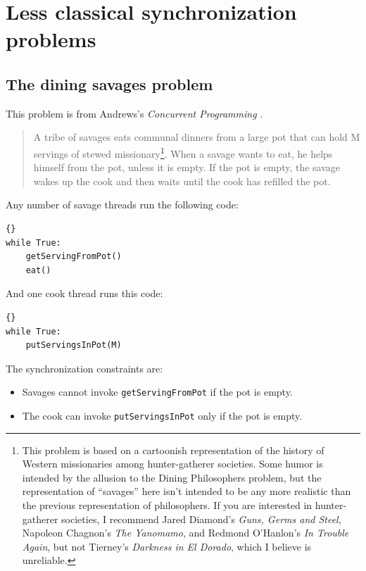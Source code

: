 \documentclass{book}
\newcommand{\clearemptydoublepage}{\newpage\cleardoublepage}
\begin{document}
\clearemptydoublepage
\chapter{Less classical synchronization problems}
\label{next}


\section{The dining savages problem}

This problem is from Andrews's 
{\em Concurrent Programming} \cite{andrews}.

\begin {quotation}
A tribe of savages eats communal dinners from a large pot that can
hold M servings of stewed missionary\footnote{This problem is based on
a cartoonish representation of the history of Western missionaries
among hunter-gatherer societies.  Some humor is intended by the
allusion to the Dining Philosophers problem, but the representation of
``savages'' here isn't intended to be any more realistic than the
previous representation of philosophers.  If you are interested in
hunter-gatherer societies, I recommend Jared Diamond's {\em Guns,
Germs and Steel}, Napoleon Chagnon's {\em The Yanomamo}, and Redmond
O'Hanlon's {\em In Trouble Again}, but not Tierney's {\em Darkness in
El Dorado}, which I believe is unreliable.}.  When a savage wants to
eat, he helps himself from the pot, unless it is empty.  If the pot is
empty, the savage wakes up the cook and then waits until the cook has
refilled the pot.
\end{quotation}

Any number of savage threads run the following code:

\begin{lstlisting}[title={Unsynchronized savage code}]{}
while True:
    getServingFromPot()
    eat()
\end{lstlisting}

And one cook thread runs this code:

\begin{lstlisting}[title={Unsynchronized cook code}]{}
while True:
    putServingsInPot(M)
\end{lstlisting}

The synchronization constraints are:

\begin{itemize}

\item Savages cannot invoke {\tt getServingFromPot} if the
pot is empty.

\item The cook can invoke {\tt putServingsInPot} only if
the pot is empty.

\end{itemize}
\end{document}
